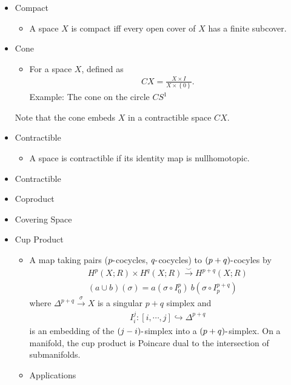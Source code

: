 \begin{itemize}
\item
  Compact

  \begin{itemize}
  \tightlist
  \item
    A space \(X\) is compact iff every open cover of \(X\) has a finite
    subcover.
  \end{itemize}
\item
  Cone

  \begin{itemize}
  \tightlist
  \item
    For a space \(X\), defined as
    \begin{align*}  
      CX = \frac{X\times I} {X \times\left\{{0}\right\}}
      .\end{align*}
    Example: The cone on the circle \(CS^1\)
  \end{itemize}

  Note that the cone embeds \(X\) in a contractible space \(CX\).
\item
  Contractible

  \begin{itemize}
  \tightlist
  \item
    A space is contractible if its identity map is nullhomotopic.
  \end{itemize}
\item
  Contractible
\item
  Coproduct
\item
  Covering Space
\item
  Cup Product

  \begin{itemize}
  \tightlist
  \item
    A map taking pairs (\(p{\hbox{-}}\)cocycles,
    \(q{\hbox{-}}\)cocycles) to \((p+q){\hbox{-}}\)cocyles by
    \begin{align*}
      H^p(X; R) \times H^q(X; R) \xrightarrow{\smile} H^{p+q}(X; R)\\
      (a \cup b)(\sigma) = a(\sigma \circ I_0^p)~b(\sigma \circ I_p^{p+q})
      \end{align*}
    where \(\Delta^{p+q} \xrightarrow{\sigma} X\) is a singular \(p+q\)
    simplex and
    \begin{align*}
      I_i^j: [i, \cdots, j] \hookrightarrow\Delta^{p+q}
      \end{align*}
    is an embedding of the \((j-i){\hbox{-}}\)simplex into a
    \((p+q){\hbox{-}}\)simplex. On a manifold, the cup product is
    Poincare dual to the intersection of submanifolds.
  \item
    Applications


\end{itemize}
\end{itemize}
